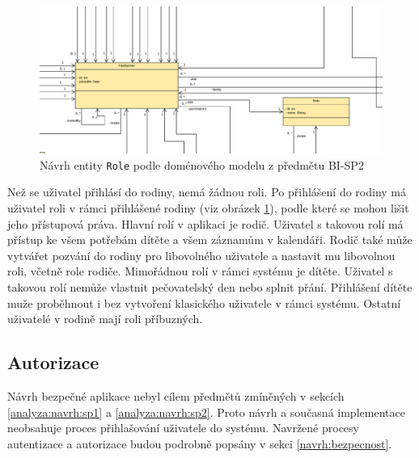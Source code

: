         \begin{figure}\centering
	        \includegraphics[width=1.0\textwidth]{pdfs/Role1}
	        \caption[Návrh \texttt{Role}]{Návrh entity \texttt{Role} podle doménového modelu z předmětu BI-SP2}\label{image:Role1}
        \end{figure}
        Než se uživatel přihlásí do rodiny, nemá žádnou roli. Po přihlášení do rodiny má uživatel roli v rámci přihlášené rodiny (viz obrázek \ref{image:Role1}), podle které se mohou lišit jeho přístupová práva. Hlavní rolí v aplikaci je rodič. Uživatel s takovou rolí má přístup ke všem potřebám dítěte a všem záznamům v kalendáři. Rodič také může vytvářet pozvání do rodiny pro libovolného uživatele a nastavit mu libovolnou roli, včetně role rodiče. Mimořádnou rolí v rámci systému je dítěte. 
        Uživatel s takovou rolí nemůže vlastnit pečovatelský den nebo splnit přání. Přihlášení dítěte muže proběhnout i bez vytvoření klasického uživatele v rámci systému. Ostatní uživatelé v rodině mají roli příbuzných. 
    
    \subsection{Autorizace}
        Návrh bezpečné aplikace nebyl cílem předmětů zmíněných v sekcích \ref{analyza:navrh:sp1} a \ref{analyza:navrh:sp2}. Proto návrh a současná implementace neobsahuje proces přihlašování uživatele do systému. Navržené procesy autentizace a autorizace budou podrobně popsány v sekci \ref{navrh:bezpecnost}.
        
